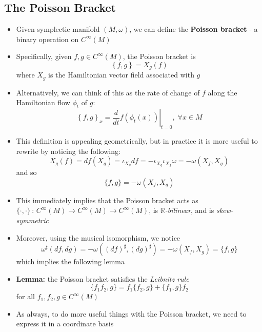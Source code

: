 \documentclass[12pt,a4paper]{article}
\numberwithin{equation}{section}
\begin{document}
	\subsection{The Poisson Bracket}
	\begin{itemize}
		\item Given symplectic manifold $(M,\omega)$, we can define the \textbf{Poisson bracket} - a binary operation on $C^{\infty}(M)$
		\item Specifically, given $f,g\in C^{\infty}(M)$, the Poisson bracket is
		\begin{equation}
			\left\{f,g\right\}=X_{g}(f)
		\end{equation}
		where $X_{g}$ is the Hamiltonian vector field associated with $g$
		\item Alternatively, we can think of this as the rate of change of $f$ along the Hamiltonian flow $\phi_{t}$ of $g$:
		\begin{equation}
			\left\{f,g\right\}_{x}=\left.\frac{d}{dt}f(\phi_{t}(x))\right\rvert_{t=0},\;\forall x\in M
		\end{equation}
		\item This definition is appealing geometrically, but in practice it is more useful to rewrite by noticing the following:
		\begin{equation}
			X_{g}(f)=df(X_{g})=\iota_{X_{g}}df=-\iota_{X_{g}}\iota_{X_{f}}\omega=-\omega(X_{f},X_{g})
		\end{equation}
		and so
		\begin{equation}
			\{f,g\}=-\omega(X_{f},X_{g})
		\end{equation}
		\item This immediately implies that the Poisson bracket acts as $\{\cdot,\cdot\}\,:\,C^{\infty}(M)\to C^{\infty}(M)\to C^{\infty}(M)$, is $\mathbb{R}$\textit{-bilinear}, and is \textit{skew-symmetric}
		\item Moreover, using the musical isomorphism, we notice
		\begin{equation}
			\omega^{\sharp}(df,dg)=-\omega\left((df)^{\sharp},(dg)^{\sharp}\right)=-\omega(X_{f},X_{g})=\{f,g\}
		\end{equation} 
		which implies the following lemma
		\item \textbf{Lemma:} the Poisson bracket satisfies the \textit{Leibnitz rule}
		\begin{equation}
			\{f_{1}f_{2},g\}=f_{1}\{f_{2},g\}+\{f_{1},g\}f_{2}
		\end{equation}
		for all $f_{1},f_{2},g\in C^{\infty}(M)$
		\item As always, to do more useful things with the Poisson bracket, we need to express it in a coordinate basis

\end{itemize}
\end{document}
